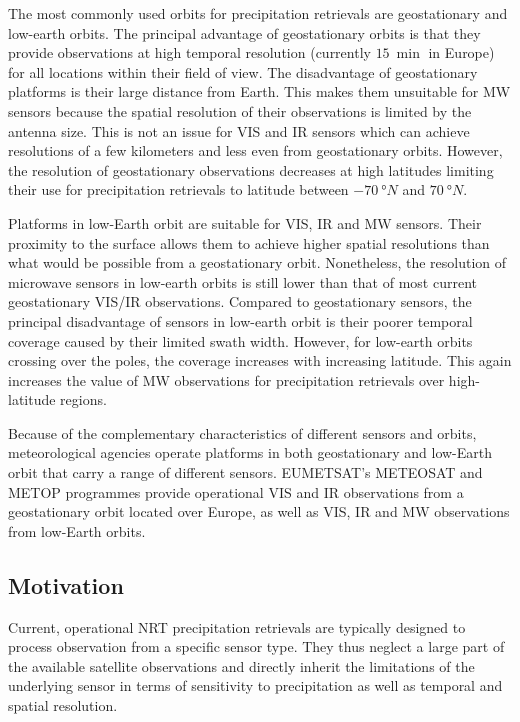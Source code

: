 \documentclass[11pt]{scrartcl}
\begin{document}
The most commonly used orbits for precipitation retrievals are geostationary and
low-earth orbits. The principal advantage of geostationary orbits is that they
provide observations at high temporal resolution (currently \(15\ \si{\min}\) in
Europe) for all locations within their field of view. The disadvantage of
geostationary platforms is their large distance from Earth. This makes them
unsuitable for MW sensors because the spatial resolution of their observations
is limited by the antenna size. This is not an issue for VIS and IR sensors
which can achieve resolutions of a few kilometers and less even from
geostationary orbits. However, the resolution of geostationary observations
decreases at high latitudes limiting their use for precipitation retrievals
to latitude between \(\SI{-70}{\degree N}\) and \(\SI{70}{\degree N}\).

Platforms in low-Earth orbit are suitable for VIS, IR and MW sensors. Their
proximity to the surface allows them to achieve higher spatial resolutions than
what would be possible from a geostationary orbit. Nonetheless, the resolution
of microwave sensors in low-earth orbits is still lower than that of most
current geostationary VIS/IR observations. Compared to geostationary sensors,
the principal disadvantage of sensors in low-earth orbit is their
poorer temporal coverage caused by their limited swath width. However, for
low-earth orbits crossing over the poles, the coverage increases with
increasing latitude. This again increases the value of MW observations for
precipitation retrievals over high-latitude regions.


Because of the complementary characteristics of different sensors and orbits,
meteorological agencies operate platforms in both geostationary and low-Earth
orbit that carry a range of different sensors. EUMETSAT's METEOSAT and METOP
programmes provide operational VIS and IR observations from a geostationary
orbit located over Europe, as well as VIS, IR and MW observations from low-Earth
orbits.

\subsection{Motivation}
\label{sec:orga93baac}

Current, operational NRT precipitation retrievals are typically designed to
process observation from a specific sensor type. They thus neglect a large part
of the available satellite observations and directly inherit the limitations of
the underlying sensor in terms of sensitivity to precipitation as well as
temporal and spatial resolution.
\end{document}
